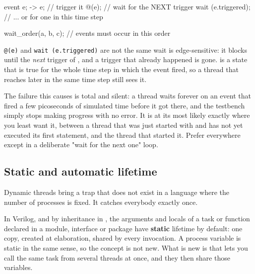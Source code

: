 \begin{svcode}
event e;
-> e;                              // trigger it
@(e);                              // wait for the NEXT trigger
wait (e.triggered);                // ... or for one in this time step

wait_order(a, b, c);               // events must occur in this order
\end{svcode}

\begin{gotcha}{\texttt{@(e)} and \texttt{wait (e.triggered)} are not the same wait}
 is edge-sensitive: it blocks until the \emph{next} trigger of
, and a trigger that already happened is gone.  is a
state that is true for the whole time step in which the event fired, so a
thread that reaches  later in the same time step
still sees it.

The failure this causes is total and silent: a thread waits forever on an
event that fired a few picoseconds of simulated time before it got there, and
the testbench simply stops making progress with no error. It is at its most
likely exactly where you least want it, between a thread that was just started
with  and has not yet executed its first statement, and the
thread that started it. Prefer  everywhere except in
a deliberate "wait for the next one" loop.
\end{gotcha}

\subsection{Static and automatic lifetime}
\label{sec:toolkit:lifetime}

Dynamic threads bring a trap that does not exist in a language where the
number of processes is fixed. It catches everybody exactly once.

In Verilog, and by inheritance in \SV{}, the arguments and locals of a task or
function declared in a module, interface or package have \textbf{static}
lifetime by default: one copy, created at elaboration, shared by every
invocation. A \VHDL{} process variable is static in the same sense, so the
concept is not new. What is new is that \SV{} lets you call the same task from
several threads at once, and they then share those variables.



